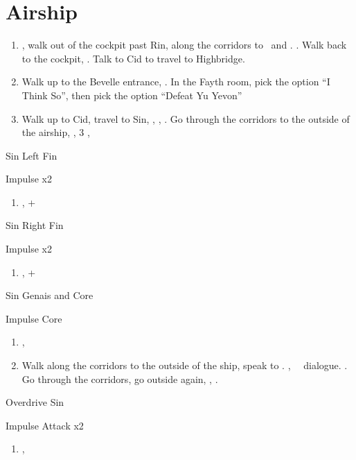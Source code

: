 \chapter{Airship}
\begin{enumerate}
    \item \sd, walk out of the cockpit past Rin, along the corridors to \yuna\ and \kimahri. \sd. Walk back to the cockpit, \sd. Talk to Cid to travel to Highbridge.
    \item Walk up to the Bevelle entrance, \sd. In the Fayth room, pick the  option ``I Think So'', then pick the  option ``Defeat Yu Yevon''
    \item Walk up to Cid, travel to Sin, \sd, \skippablefmv, \sd. Go through the corridors to the outside of the airship, \sd, 3 \skippablefmv[2:10], \sd
\end{enumerate}
\begin{battle}[65000]{Sin Left Fin}
    \begin{itemize}
        \summon{\bahamut}
        \bahamutf Impulse x2
    \end{itemize}
\end{battle}
\begin{enumerate}[resume]
    \item \sd, \cs+\skippablefmv
\end{enumerate}
\begin{battle}[65000]{Sin Right Fin}
    \begin{itemize}
        \summon{\bahamut}
        \bahamutf Impulse x2
    \end{itemize}
\end{battle}
\begin{enumerate}[resume]
    \item \sd, \cs+\skippablefmv
\end{enumerate}
\begin{battle}[56000]{Sin Genais and Core}
    \begin{itemize}
        \summon{\bahamut}
        \bahamutf Impulse Core
    \end{itemize}
\end{battle}
\begin{enumerate}[resume]
    \item \sd, \skippablefmv
    \item Walk along the corridors to the outside of the ship, speak to \yuna. \cs[1:40], \sd\ \rikku\ dialogue. \skippablefmv. Go through the corridors, go outside again, \skippablefmv, \sd.
\end{enumerate}
\begin{battle}[140000]{Overdrive Sin}
    \begin{itemize}
        \summon{\bahamut}
        \bahamutf Impulse
        \bahamutf Attack x2
    \end{itemize}
\end{battle}
\begin{enumerate}[resume]
    \item \skippablefmv[1:20], \sd
\end{enumerate}